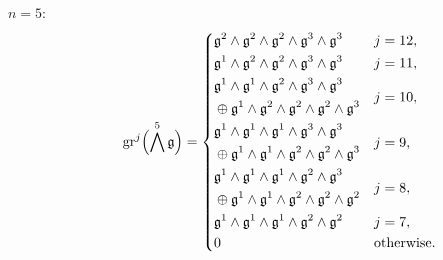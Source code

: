 \begin{description}
  \item[$n=5:$]
        \begin{equation*}
          \operatorname{gr}^{j}\Bigl( \bigwedge^{5}\mathfrak{g} \Bigr) =
          \begin{dcases}
            \mathfrak{g}^{2} \wedge \mathfrak{g}^{2} \wedge \mathfrak{g}^{2} \wedge \mathfrak{g}^{3} \wedge \mathfrak{g}^{3} & j=12,                                                                                                                   \\
            \mathfrak{g}^{1} \wedge \mathfrak{g}^{2} \wedge \mathfrak{g}^{2} \wedge \mathfrak{g}^{3} \wedge \mathfrak{g}^{3} & j=11, \\
            \!\begin{aligned} & \mathfrak{g}^{1} \wedge \mathfrak{g}^{1} \wedge \mathfrak{g}^{2} \wedge \mathfrak{g}^{3} \wedge \mathfrak{g}^{3} \\ & \oplus \mathfrak{g}^{1} \wedge \mathfrak{g}^{2} \wedge \mathfrak{g}^{2} \wedge \mathfrak{g}^{2} \wedge \mathfrak{g}^{3} \end{aligned} & j=10, \\
            \!\begin{aligned} & \mathfrak{g}^{1} \wedge \mathfrak{g}^{1} \wedge \mathfrak{g}^{1} \wedge \mathfrak{g}^{3} \wedge \mathfrak{g}^{3} \\ & \oplus \mathfrak{g}^{1} \wedge \mathfrak{g}^{1} \wedge \mathfrak{g}^{2} \wedge \mathfrak{g}^{2} \wedge \mathfrak{g}^{3} \end{aligned} & j=9, \\
            \!\begin{aligned} & \mathfrak{g}^{1} \wedge \mathfrak{g}^{1} \wedge \mathfrak{g}^{1} \wedge \mathfrak{g}^{2} \wedge \mathfrak{g}^{3} \\ & \oplus \mathfrak{g}^{1} \wedge \mathfrak{g}^{1} \wedge \mathfrak{g}^{2} \wedge \mathfrak{g}^{2} \wedge \mathfrak{g}^{2} \end{aligned} & j=8, \\
            \mathfrak{g}^{1} \wedge \mathfrak{g}^{1} \wedge \mathfrak{g}^{1} \wedge \mathfrak{g}^{2} \wedge \mathfrak{g}^{2}                                                                                                                  & j=7, \\
            0                                                                                                                                                                                                      & \text{otherwise.}
          \end{dcases}
        \end{equation*}



\end{description}
